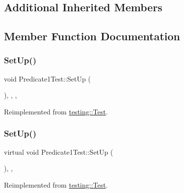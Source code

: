 \subsection*{Additional Inherited Members}


\subsection{Member Function Documentation}
\mbox{\label{class_predicate1_test_a26ffe626e992d5983e6a48c965b0a0a9}} 
\subsubsection{\texorpdfstring{SetUp()}{SetUp()}\hspace{0.1cm}{\footnotesize\ttfamily [1/3]}}
{\footnotesize\ttfamily void Predicate1\+Test\+::\+Set\+Up (\begin{DoxyParamCaption}{ }\end{DoxyParamCaption})\hspace{0.3cm}{\ttfamily [inline]}, {\ttfamily [override]}, {\ttfamily [protected]}, {\ttfamily [virtual]}}



Reimplemented from \mbox{\hyperlink{classtesting_1_1_test_a190315150c303ddf801313fd1a777733}{testing\+::\+Test}}.

\mbox{\label{class_predicate1_test_a481704a09f73a37158513f9a336dbdd9}} 
\subsubsection{\texorpdfstring{SetUp()}{SetUp()}\hspace{0.1cm}{\footnotesize\ttfamily [2/3]}}
{\footnotesize\ttfamily virtual void Predicate1\+Test\+::\+Set\+Up (\begin{DoxyParamCaption}{ }\end{DoxyParamCaption})\hspace{0.3cm}{\ttfamily [inline]}, {\ttfamily [protected]}, {\ttfamily [virtual]}}



Reimplemented from \mbox{\hyperlink{classtesting_1_1_test_a190315150c303ddf801313fd1a777733}{testing\+::\+Test}}.

